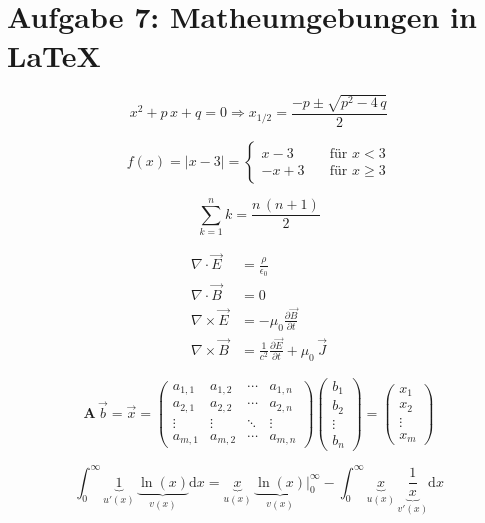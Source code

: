 \newpage
\section{Aufgabe 7: Matheumgebungen in \LaTeX}
\begin{equation}
    x^2 + p\,x + q = 0 \Rightarrow x_{1/2} = \frac{-p \pm \sqrt{p^2 - 4\,q}}{2}
\end{equation}

\begin{equation}
    f(x) = \left|x-3\right| =
    \begin{cases}
        x-3 & \quad \text{für } x < 3 \\
        -x+3 & \quad \text{für } x \ge 3
    \end{cases}
\end{equation}

\begin{equation}
    \sum_{k=1}^n k = \frac{n\,(n+1)}{2}
\end{equation}

\begin{subequations}
\begin{align}
    \nabla \cdot \vec{E} &= \frac{\rho}{\epsilon_0} \\
    \nabla \cdot \vec{B} &= 0 \\
    \nabla \times \vec{E} &= -\mu_0 \frac{\partial \vec{B}}{\partial t} \\
    \nabla \times \vec{B} &= \frac{1}{c^2}\frac{\partial \vec{E}}{\partial t} +
    \mu_0\,\vec{J}
\end{align}
\end{subequations}

\begin{equation}
    \mathbf{A}\,\vec{b} = \vec{x} =
    \begin{pmatrix}
        a_{1,1} & a_{1,2} & \cdots & a_{1,n} \\
        a_{2,1} & a_{2,2} & \cdots & a_{2,n} \\
        \vdots & \vdots & \ddots & \vdots \\
        a_{m,1} & a_{m,2} & \cdots & a_{m,n}
    \end{pmatrix}
    \begin{pmatrix}
        b_1 \\ b_2 \\ \vdots \\ b_n
    \end{pmatrix}
    =
    \begin{pmatrix}
        x_1 \\ x_2 \\ \vdots \\ x_m
    \end{pmatrix}
\end{equation}

\begin{equation}
    \int_0^\infty \underbrace{1}_{u'(x)} \, \underbrace{\ln(x)}_{v(x)}
    \mathrm{d}x = \underbrace{x}_{u(x)} \, \underbrace{\ln(x)}_{v(x)}
    \bigg\rvert_0^\infty - \int_0^\infty \underbrace{x}_{u(x)} \,
    \underbrace{\frac{1}{x}}_{v'(x)} \mathrm{d}x
\end{equation}

